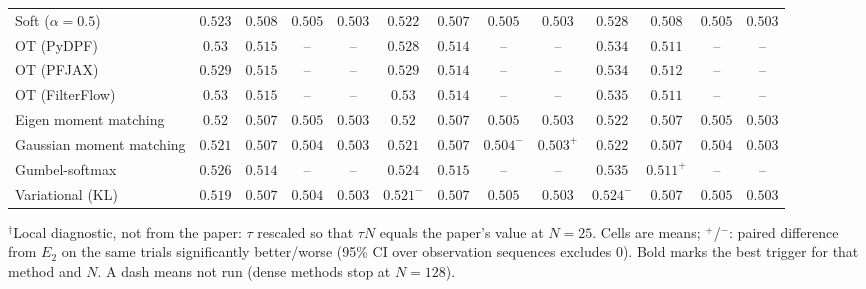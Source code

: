 \begin{table}[ht]
\begin{adjustbox}{max width=\linewidth}
\begin{tabular}{lcccc|cccc|cccc}
Soft ($\alpha{=}0.5$) & $0.523$ & $0.508$ & $0.505$ & $0.503$ & $\mathbf{0.522}$ & $\mathbf{0.507}$ & $0.505$ & $\mathbf{0.503}$ & $0.528$ & $0.508$ & $\mathbf{0.505}$ & $0.503$ \\
OT (PyDPF) & $0.53$ & $0.515$ & -- & -- & $\mathbf{0.528}$ & $0.514$ & -- & -- & $0.534$ & $\mathbf{0.511}$ & -- & -- \\
OT (PFJAX) & $0.529$ & $0.515$ & -- & -- & $\mathbf{0.529}$ & $0.514$ & -- & -- & $0.534$ & $\mathbf{0.512}$ & -- & -- \\
OT (FilterFlow) & $0.53$ & $0.515$ & -- & -- & $\mathbf{0.53}$ & $0.514$ & -- & -- & $0.535$ & $\mathbf{0.511}$ & -- & -- \\
Eigen moment matching & $\mathbf{0.52}$ & $0.507$ & $0.505$ & $0.503$ & $0.52$ & $0.507$ & $\mathbf{0.505}$ & $\mathbf{0.503}$ & $0.522$ & $\mathbf{0.507}$ & $0.505$ & $0.503$ \\
Gaussian moment matching & $\mathbf{0.521}$ & $\mathbf{0.507}$ & $\mathbf{0.504}$ & $0.503$ & $0.521$ & $0.507$ & $0.504^{-}$ & $\mathbf{0.503}^{+}$ & $0.522$ & $0.507$ & $0.504$ & $0.503$ \\
Gumbel-softmax & $0.526$ & $0.514$ & -- & -- & $\mathbf{0.524}$ & $0.515$ & -- & -- & $0.535$ & $\mathbf{0.511}^{+}$ & -- & -- \\
Variational (KL) & $\mathbf{0.519}$ & $0.507$ & $\mathbf{0.504}$ & $0.503$ & $0.521^{-}$ & $\mathbf{0.507}$ & $0.505$ & $\mathbf{0.503}$ & $0.524^{-}$ & $0.507$ & $0.505$ & $0.503$ \\
\bottomrule
\end{tabular}
\end{adjustbox}
\par\smallskip\parbox{0.95\linewidth}{\footnotesize $^\dagger$Local diagnostic, not from the paper: $\tau$ rescaled so that $\tau N$ equals the paper's value at $N{=}25$. Cells are means; $^{+}$/$^{-}$: paired difference from $E_2$ on the same trials significantly better/worse (95\% CI over observation sequences excludes 0). Bold marks the best trigger for that method and $N$. A dash means not run (dense methods stop at $N{=}128$).}
\end{table}

